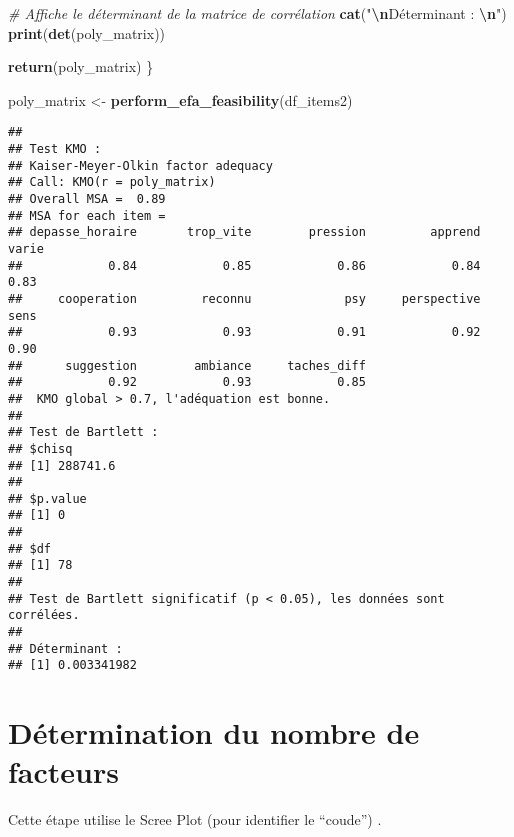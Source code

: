 \documentclass[
]{article}
\newenvironment{Shaded}{\begin{snugshade}}{\end{snugshade}}
\newcommand{\CommentTok}[1]{\textcolor[rgb]{0.56,0.35,0.01}{\textit{#1}}}
\newcommand{\FunctionTok}[1]{\textcolor[rgb]{0.13,0.29,0.53}{\textbf{#1}}}
\newcommand{\NormalTok}[1]{#1}
\newcommand{\OtherTok}[1]{\textcolor[rgb]{0.56,0.35,0.01}{#1}}
\newcommand{\SpecialCharTok}[1]{\textcolor[rgb]{0.81,0.36,0.00}{\textbf{#1}}}
\newcommand{\StringTok}[1]{\textcolor[rgb]{0.31,0.60,0.02}{#1}}
\begin{document}
\begin{Shaded}
\begin{Highlighting}[]
  \CommentTok{\# Affiche le déterminant de la matrice de corrélation}
  \FunctionTok{cat}\NormalTok{(}\StringTok{"}\SpecialCharTok{\textbackslash{}n}\StringTok{Déterminant : }\SpecialCharTok{\textbackslash{}n}\StringTok{"}\NormalTok{)}
  \FunctionTok{print}\NormalTok{(}\FunctionTok{det}\NormalTok{(poly\_matrix))}

  \FunctionTok{return}\NormalTok{(poly\_matrix)}
\NormalTok{\}}

\NormalTok{poly\_matrix }\OtherTok{\textless{}{-}} \FunctionTok{perform\_efa\_feasibility}\NormalTok{(df\_items2)}
\end{Highlighting}
\end{Shaded}

\begin{verbatim}
## 
## Test KMO :
## Kaiser-Meyer-Olkin factor adequacy
## Call: KMO(r = poly_matrix)
## Overall MSA =  0.89
## MSA for each item = 
## depasse_horaire       trop_vite        pression         apprend           varie 
##            0.84            0.85            0.86            0.84            0.83 
##     cooperation         reconnu             psy     perspective            sens 
##            0.93            0.93            0.91            0.92            0.90 
##      suggestion        ambiance     taches_diff 
##            0.92            0.93            0.85 
##  KMO global > 0.7, l'adéquation est bonne.
## 
## Test de Bartlett :
## $chisq
## [1] 288741.6
## 
## $p.value
## [1] 0
## 
## $df
## [1] 78
## 
## Test de Bartlett significatif (p < 0.05), les données sont corrélées.
## 
## Déterminant : 
## [1] 0.003341982
\end{verbatim}

\section{Détermination du nombre de
facteurs}\label{duxe9termination-du-nombre-de-facteurs}

Cette étape utilise le Scree Plot (pour identifier le ``coude'') .
\end{document}
